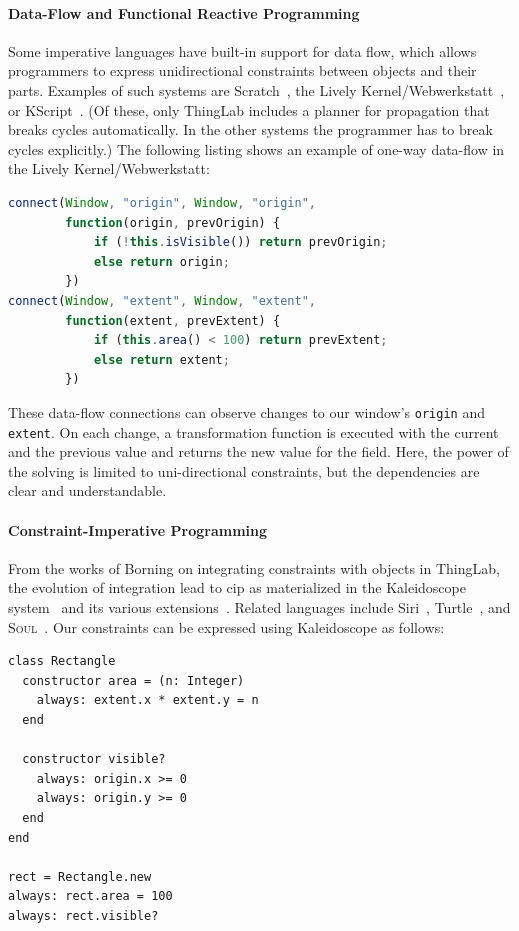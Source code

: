 \paragraph{Data-Flow and Functional Reactive Programming}
Some imperative languages have built-in support for data flow, which allows
programmers to express unidirectional constraints between objects and
their parts. Examples of such systems are
Scratch~\cite{resnick2009scratch}, the Lively Kernel/Webwerkstatt~\cite{lively-kernel-2008}, or
KScript~\cite{ohshima2013onward}. (Of these, only ThingLab includes a planner for
propagation that breaks cycles automatically. In the other systems the
programmer has to break cycles explicitly.) The following listing shows 
an example of one-way data-flow in the Lively Kernel/Webwerkstatt:
\begin{lstlisting}[language=JavaScript]
connect(Window, "origin", Window, "origin",
        function(origin, prevOrigin) {
            if (!this.isVisible()) return prevOrigin;
            else return origin;
        })
connect(Window, "extent", Window, "extent",
        function(extent, prevExtent) {
            if (this.area() < 100) return prevExtent;
            else return extent;
        })
\end{lstlisting}

These data-flow connections can observe changes to our window's
\lstinline{origin} and \lstinline{extent}.  On each change, a transformation
function is executed with the current and the previous value and returns the new
value for the field. Here, the power of the solving is limited to
uni-directional constraints, but the dependencies are clear and understandable.

\medskip
\paragraph{Constraint-Imperative Programming}
From the works of Borning on integrating constraints with objects in
ThingLab, the evolution of integration lead to \ac{cip} as
materialized in the Kaleidoscope system~\cite{freeman-benson-oopsla-1990} and
its various extensions~\cite{lopez-oopsla-1994}. Related languages include
Siri~\cite{horn-myers-book}, Turtle~\cite{grabmuller2004turtle}, and \textsc{Soul}~\cite{DHondt:2004:soul-symbiosis}. Our
constraints can be expressed using Kaleidoscope as follows:
\begin{lstlisting}
class Rectangle
  constructor area = (n: Integer)
    always: extent.x * extent.y = n
  end

  constructor visible?
    always: origin.x >= 0
    always: origin.y >= 0
  end
end

rect = Rectangle.new
always: rect.area = 100
always: rect.visible?
\end{lstlisting}


